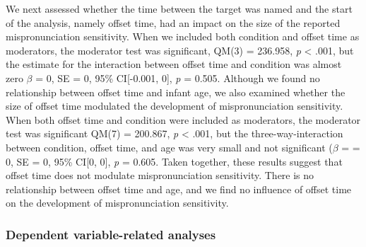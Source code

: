 \documentclass[man]{apa6}
\theoremstyle{definition}
\theoremstyle{definition}
\theoremstyle{definition}
\theoremstyle{remark}
\begin{document}
We next assessed whether the time between the target was named and the
start of the analysis, namely offset time, had an impact on the size of
the reported mispronunciation sensitivity. When we included both
condition and offset time as moderators, the moderator test was
significant, QM(3) = 236.958, \emph{p} \textless{} .001, but the
estimate for the interaction between offset time and condition was
almost zero \(\beta\) = 0, SE = 0, 95\% CI{[}-0.001, 0{]}, \emph{p} =
0.505. Although we found no relationship between offset time and infant
age, we also examined whether the size of offset time modulated the
development of mispronunciation sensitivity. When both offset time and
condition were included as moderators, the moderator test was
significant QM(7) = 200.867, \emph{p} \textless{} .001, but the
three-way-interaction between condition, offset time, and age was very
small and not significant (\(\beta\) = = 0, SE = 0, 95\% CI{[}0, 0{]},
\emph{p} = 0.605. Taken together, these results suggest that offset time
does not modulate mispronunciation sensitivity. There is no relationship
between offset time and age, and we find no influence of offset time on
the development of mispronunciation sensitivity.

\subsubsection{Dependent variable-related
analyses}\label{dependent-variable-related-analyses}
\end{document}
